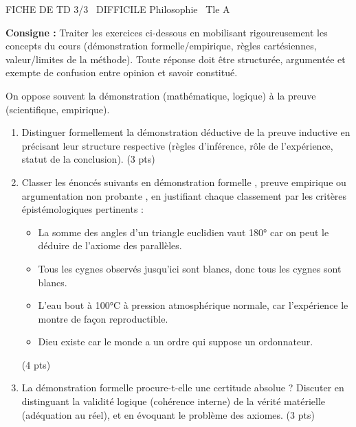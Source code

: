 \documentclass[11pt]{article}
\begin{document}
\begin{tcolorbox}[enhanced,colback=popink,colframe=popink,arc=10pt,boxrule=0pt,left=12pt,right=12pt,top=9pt,bottom=9pt]
{\color{white}\popxbold\small FICHE DE TD 3/3 \textbullet\ DIFFICILE \hfill Philosophie \textbullet\ Tle A\par}
\end{tcolorbox}
\vspace{4pt}
\noindent\textbf{Consigne :} Traiter les exercices ci-dessous en mobilisant rigoureusement les concepts du cours (démonstration formelle/empirique, règles cartésiennes, valeur/limites de la méthode). Toute réponse doit être structurée, argumentée et exempte de confusion entre opinion et savoir constitué.

\begin{exercice}
On oppose souvent la \og démonstration \fg{} (mathématique, logique) à la \og preuve \fg{} (scientifique, empirique). 
\begin{enumerate}
    \item Distinguer formellement la démonstration déductive de la preuve inductive en précisant leur structure respective (règles d'inférence, rôle de l'expérience, statut de la conclusion). (3 pts)
    \item Classer les énoncés suivants en \og démonstration formelle \fg{}, \og preuve empirique \fg{} ou \og argumentation non probante \fg{}, en justifiant chaque classement par les critères épistémologiques pertinents :
    \begin{itemize}
        \item \og La somme des angles d'un triangle euclidien vaut 180° car on peut le déduire de l'axiome des parallèles. \fg{}
        \item \og Tous les cygnes observés jusqu'ici sont blancs, donc tous les cygnes sont blancs. \fg{}
        \item \og L'eau bout à 100°C à pression atmosphérique normale, car l'expérience le montre de façon reproductible. \fg{}
        \item \og Dieu existe car le monde a un ordre qui suppose un ordonnateur. \fg{}
    \end{itemize} (4 pts)
    \item La démonstration formelle procure-t-elle une certitude absolue ? Discuter en distinguant la validité logique (cohérence interne) de la vérité matérielle (adéquation au réel), et en évoquant le problème des axiomes. (3 pts)
\end{enumerate}
\end{exercice}
\end{document}
